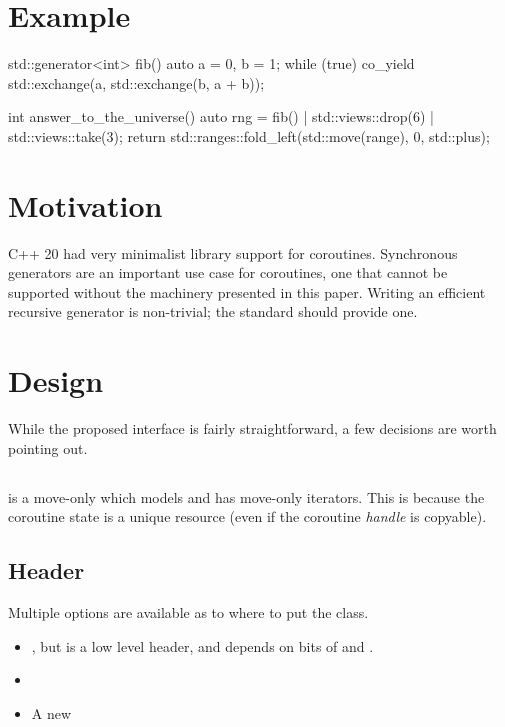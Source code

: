 \documentclass{wg21}
\begin{document}
\section{Example}

\begin{colorblock}
    std::generator<int> fib() {
        auto a = 0, b = 1;
        while (true) {
            co_yield std::exchange(a, std::exchange(b, a + b));
        }
    }

    int answer_to_the_universe() {
        auto rng = fib() | std::views::drop(6) | std::views::take(3);
        return std::ranges::fold_left(std::move(range), 0, std::plus{});
    }
\end{colorblock}


\section{Motivation}

C++ 20 had very minimalist library support for coroutines.
Synchronous generators are an important use case for coroutines,
one that cannot be supported
without the machinery presented in this paper.
Writing an efficient recursive generator is non-trivial;
the standard should provide one.


\section{Design}

While the proposed  interface is fairly straightforward, a few decisions are worth pointing out.

\subsection{}

 is a move-only  which models  and has move-only iterators.
This is because the coroutine state is a unique resource (even if the coroutine \textit{handle} is copyable).


\subsection{Header}

Multiple options are available as to where to put the  class.

\begin{itemize}
\item {}, but  is a low level header,
  and  depends on bits of  and .

\item {}

\item A new 
\end{itemize}
\end{document}
